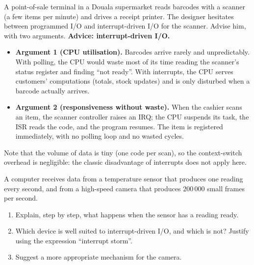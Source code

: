 \documentclass[11pt]{article}
\begin{document}
\begin{exoresolu}
A point-of-sale terminal in a Douala supermarket reads barcodes with a scanner (a few items per minute) and drives a receipt printer. The designer hesitates between programmed I/O and interrupt-driven I/O for the scanner. Advise him, with two arguments.
\tcblower
\textbf{Advice: interrupt-driven I/O.}
\begin{itemize}
\item \textbf{Argument 1 (CPU utilisation).} Barcodes arrive rarely and unpredictably. With polling, the CPU would waste most of its time reading the scanner's status register and finding ``not ready''. With interrupts, the CPU serves customers' computations (totals, stock updates) and is only disturbed when a barcode actually arrives.
\item \textbf{Argument 2 (responsiveness without waste).} When the cashier scans an item, the scanner controller raises an IRQ; the CPU suspends its task, the ISR reads the code, and the program resumes. The item is registered immediately, with no polling loop and no wasted cycles.
\end{itemize}
Note that the volume of data is tiny (one code per scan), so the context-switch overhead is negligible: the classic disadvantage of interrupts does not apply here.
\end{exoresolu}

\begin{exercice}
A computer receives data from a temperature sensor that produces one reading every second, and from a high-speed camera that produces $200\,000$ small frames per second.
\begin{enumerate}
\item Explain, step by step, what happens when the sensor has a reading ready.
\item Which device is well suited to interrupt-driven I/O, and which is not? Justify using the expression ``interrupt storm''.
\item Suggest a more appropriate mechanism for the camera.
\end{enumerate}
\end{exercice}
\end{document}
